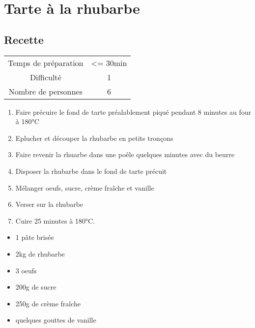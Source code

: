 \newpage
\section{Tarte à la rhubarbe}
    \label{sec:Tarte à la rhubarbe}
    \subsection{Recette}
    \vspace{1cm}


    \begin{center}
        \begin{tabular}{c|c}
            Temps de préparation & <= 30min \\
            Difficulté & 1 \\
            Nombre de personnes & 6 
        \end{tabular}
    \end{center}{}

    \vspace{1cm}
    \hline
    \vspace{1cm}

    \begin{minipage}{.7\textwidth}
        \begin{enumerate}
            \item Faire précuire le fond de tarte préalablement piqué pendant 8 minutes au four à 180°C
	    \item Eplucher et découper la rhubarbe en petits tronçons
	    \item Faire revenir la rhuarbe dans une poêle quelques minutes avec du beurre
	    \item Disposer la rhubarbe dans le fond de tarte précuit
	    \item Mélanger oeufs, sucre, crème fraîche et vanille
	    \item Verser sur la rhubarbe
	    \item Cuire 25 minutes à 180°C.

        \end{enumerate}
    \end{minipage}
    \begin{minipage}{.3\textwidth}
        \begin{flushleft}
        \begin{itemize}
            \item 1 pâte brisée
	    \item 2kg de rhubarbe
	    \item 3 oeufs
	    \item 200g de sucre
	    \item 250g de crème fraîche
	    \item quelques gouttes de vanille

        \end{itemize}
        \end{flushleft}
    \end{minipage}
    
